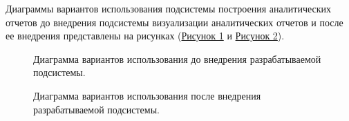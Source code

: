 \documentclass[a4paper]{extarticle}
\begin{document}
Диаграммы вариантов использования подсистемы построения аналитических отчетов до внедрения подсистемы визуализации аналитических отчетов и после ее внедрения представлены на рисунках (\hyperref[ris1]{Рисунок 1} и \hyperref[ris2]{Рисунок 2}).
\begin{figure}[H]
\caption{Диаграмма вариантов использования до внедрения разрабатываемой подсистемы.}
\label{ris1}
\end{figure}\par
\begin{figure}[H]
\caption{Диаграмма вариантов использования после внедрения разрабатываемой подсистемы.}
\label{ris2}
\end{figure}\par
\end{document}
